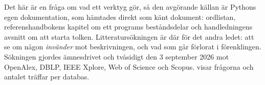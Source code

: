 Det här är en fråga om vad ett verktyg gör, så den avgörande källan är
Pythons egen dokumentation, som hämtades direkt som känt dokument:
ordlistan\autocite{PythonGlossary}, referenshandbokens kapitel om ett
programs beståndsdelar\autocite{PythonToplevel} och handledningens
avsnitt om att starta tolken\autocite{PythonTutorialInterpreter}.
Litteratursökningen är där för det andra ledet: att se om någon
\emph{invänder} mot beskrivningen, och vad som går förlorat i
förenklingen.  Sökningen gjordes ämnesdrivet och tvåsidigt den 3 september 2026
mot OpenAlex, DBLP, IEEE Xplore, Web of Science och Scopus.
 visar frågorna och antalet träffar per databas.

